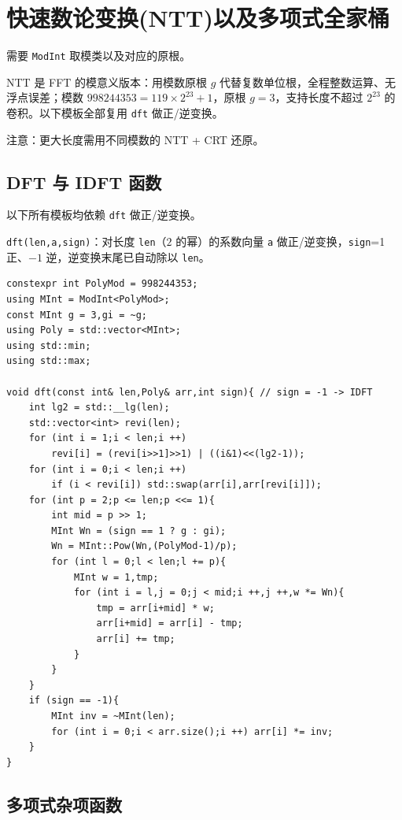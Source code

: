 \section{快速数论变换(NTT)以及多项式全家桶}

需要 \texttt{ModInt} 取模类以及对应的原根。

NTT 是 FFT 的模意义版本：用模数原根 $g$ 代替复数单位根，全程整数运算、无浮点误差；模数 $998244353=119\times 2^{23}+1$，原根 $g=3$，支持长度不超过 $2^{23}$ 的卷积。以下模板全部复用 \texttt{dft} 做正/逆变换。

注意：更大长度需用不同模数的 NTT + CRT 还原。

\subsection{DFT 与 IDFT 函数}

以下所有模板均依赖 \texttt{dft} 做正/逆变换。

\texttt{dft(len,a,sign)}：对长度 \texttt{len}（$2$ 的幂）的系数向量 \texttt{a} 做正/逆变换，\texttt{sign}=1 正、$-1$ 逆，逆变换末尾已自动除以 \texttt{len}。

\begin{lstlisting}
constexpr int PolyMod = 998244353;
using MInt = ModInt<PolyMod>;
const MInt g = 3,gi = ~g;
using Poly = std::vector<MInt>;
using std::min;
using std::max;

void dft(const int& len,Poly& arr,int sign){ // sign = -1 -> IDFT
    int lg2 = std::__lg(len);
    std::vector<int> revi(len);
    for (int i = 1;i < len;i ++)
        revi[i] = (revi[i>>1]>>1) | ((i&1)<<(lg2-1));
    for (int i = 0;i < len;i ++)
        if (i < revi[i]) std::swap(arr[i],arr[revi[i]]);
    for (int p = 2;p <= len;p <<= 1){
        int mid = p >> 1;
        MInt Wn = (sign == 1 ? g : gi);
        Wn = MInt::Pow(Wn,(PolyMod-1)/p);
        for (int l = 0;l < len;l += p){
            MInt w = 1,tmp;
            for (int i = l,j = 0;j < mid;i ++,j ++,w *= Wn){
                tmp = arr[i+mid] * w;
                arr[i+mid] = arr[i] - tmp;
                arr[i] += tmp;
            }
        }
    }
    if (sign == -1){
        MInt inv = ~MInt(len);
        for (int i = 0;i < arr.size();i ++) arr[i] *= inv;
    }
}
\end{lstlisting}

\subsection{多项式杂项函数}

